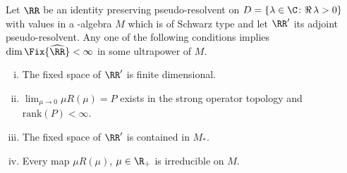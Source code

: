 \begin{theorem}\label{thm:d4-4.4}
Let $ \RR $  be an identity preserving pseudo-resolvent on $ D = \{\lambda \in \C \colon  \Re\,\lambda > 0\} $  with values in a \WA-algebra $ M $  which is of Schwarz type and let $ \RR' $  its adjoint pseudo-resolvent.
Any one of the following conditions implies $ \dim \Fix{\widehat{\RR}} < \infty $  in some ultrapower of $ M $.
\begin{enumerate}[(i)]
\item
The fixed space of $ \RR' $  is finite dimensional.

\item
$ \lim_{\mu \to 0} \mu R(\mu) = P $  exists in the strong operator topology and $ \text{rank}(P) < \infty $.

\item
The fixed space of $ \RR' $  is contained in $ M_{*} $.

\item
Every map $ \mu R(\mu) $, $ \mu \in \R_{+} $ is irreducible on $ M $.
\end{enumerate}
\end{theorem}
